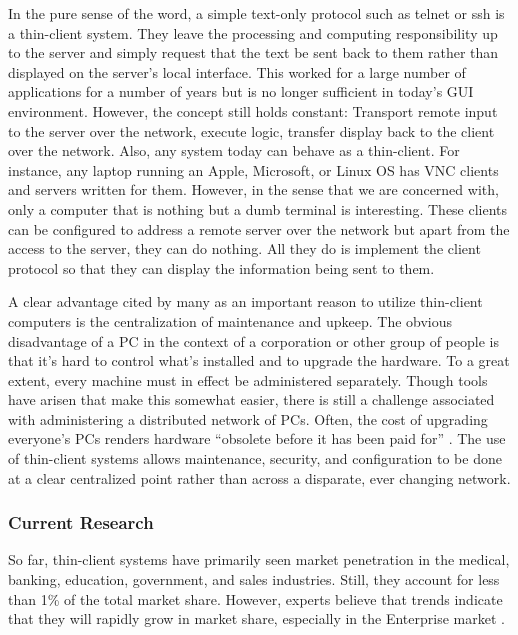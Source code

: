\documentclass[12pt,oneside,letterpaper,titlepage]{article}
\begin{document}
In the pure sense of the word, a simple text-only protocol such as telnet or ssh
is a thin-client system.  They leave the processing and computing responsibility
up to the server and simply request that the text be sent back to them rather
than displayed on the server's local interface.  This worked for a large number
of applications for a number of years but is no longer sufficient in today's GUI
environment.  However, the concept still holds constant: Transport remote input
to the server over the network, execute logic, transfer display back to the
client over the network.  Also, any system today can behave as a thin-client.
For instance, any laptop running an Apple, Microsoft, or Linux OS has VNC
clients and servers written for them.  However, in the sense that we are
concerned with, only a computer that is nothing but a dumb terminal is
interesting.  These clients can be configured to address a remote server over
the network but apart from the access to the server, they can do nothing.  All
they do is implement the client protocol so that they can display the
information being sent to them.

A clear advantage cited by many as an important reason to utilize thin-client
computers is the centralization of maintenance and upkeep.  The obvious
disadvantage of a PC in the context of a corporation or other group of people is
that it's hard to control what's installed and to upgrade the hardware.  To a
great extent, every machine must in effect be administered separately.  Though
tools have arisen that make this somewhat easier, there is still a challenge
associated with administering a distributed network of PCs.  Often, the cost of
upgrading everyone's PCs renders hardware ``obsolete before it has been paid
for'' \citep{schmidt1999}.  The use of thin-client systems allows maintenance,
security, and configuration to be done at a clear centralized point rather than
across a disparate, ever changing network.

\subsubsection{Current Research}

So far, thin-client systems have primarily seen market penetration in the
medical, banking, education, government, and sales industries. Still, they
account for less than 1\% of the total market share.  However, experts believe
that trends indicate that they will rapidly grow in market share, especially in
the Enterprise market \citep{tynan2005}.
\end{document}
